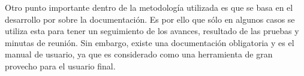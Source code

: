 Otro punto importante dentro de la metodología utilizada es que se basa en el desarrollo por sobre la documentación. Es por ello que sólo en algunos casos se utiliza esta para tener un seguimiento de los avances, resultado de las pruebas y minutas de reunión. Sin embargo, existe una documentación obligatoria y es el manual de usuario, ya que es considerado como una herramienta de gran provecho para el usuario final.